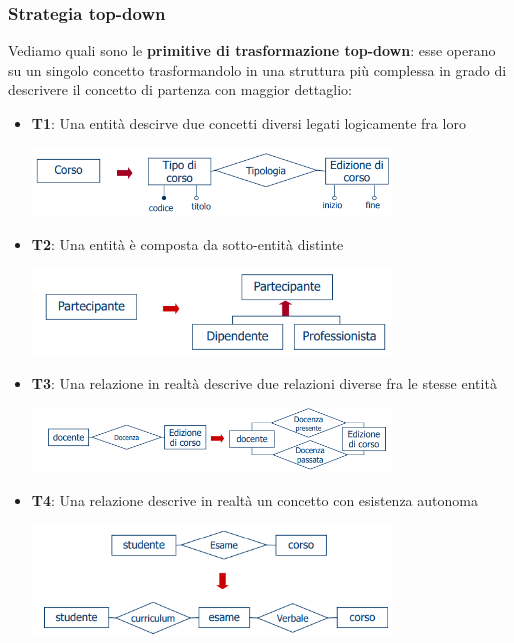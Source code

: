 \documentclass[12pt]{article}
\begin{document}
\subsubsection{Strategia top-down}
Vediamo quali sono le \textbf{primitive di trasformazione top-down}: esse operano su un singolo concetto trasformandolo in una struttura più complessa in grado di descrivere il concetto di partenza con maggior dettaglio:
\begin{itemize}
    \item \textbf{T1}: Una entità descirve due concetti diversi legati logicamente fra loro
    \begin{center}
        \includegraphics[width = 0.75\textwidth]{Images/57.PNG}
    \end{center}
    \item \textbf{T2}: Una entità è composta da sotto-entità distinte
    \begin{center}
        \includegraphics[width = 0.75\textwidth]{Images/58.PNG}
    \end{center}
    \item \textbf{T3}: Una relazione in realtà descrive due relazioni diverse fra le stesse entità
    \begin{center}
        \includegraphics[width = 0.75\textwidth]{Images/59.PNG}
    \end{center}
    \item \textbf{T4}: Una relazione descrive in realtà un concetto con esistenza autonoma
    \begin{center}
        \includegraphics[width = 0.75\textwidth]{Images/60.PNG}

\end{center}
\end{itemize}
\end{document}
